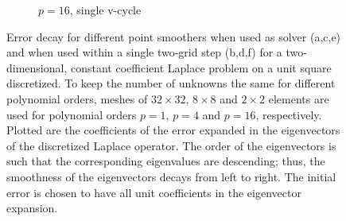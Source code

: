 \documentclass[smallcondensed,final]{svjour3}     %
\begin{document}
\begin{figure}
\begin{subfigure}[b]{0.49\textwidth}
		\caption{$p=16$, single v-cycle}
	\end{subfigure}
	\caption{\label{fig:smoothers2} Error decay for different
          point smoothers when used as solver (a,c,e) and when used
          within a single two-grid step (b,d,f) for a two-dimensional,
          constant coefficient Laplace problem on a unit square
          discretized. To keep the number of unknowns the same for
          different polynomial orders, meshes of $32\times 32$,
          $8\times 8$ and $2\times 2$ elements are used for polynomial
          orders $p=1$, $p=4$ and $p=16$, respectively.
          Plotted are the coefficients of the error
          expanded in the eigenvectors of the discretized Laplace
          operator. The order of the eigenvectors is such that the
          corresponding eigenvalues are descending; thus, the
          smoothness of the eigenvectors decays from left to right.
          The initial error is chosen to have all unit coefficients in
          the eigenvector expansion.}
\end{figure}

\end{document}
